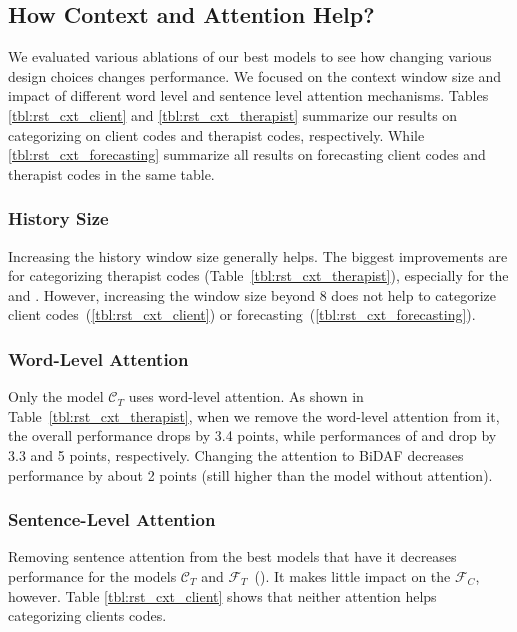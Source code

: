 \subsection{How Context and Attention Help?}
\label{ssec:snt:abl_context_attention}

We evaluated various ablations of our best models to see how changing
various design choices changes performance. We focused on the context
window size and impact of different word level and sentence level
attention mechanisms. Tables \ref{tbl:rst_cxt_client} and
\ref{tbl:rst_cxt_therapist} summarize our results on categorizing on
client codes and therapist codes, respectively. While
\autoref{tbl:rst_cxt_forecasting} summarize all results on forecasting
client codes and therapist codes in the same table.

\subsubsection{History Size}
\label{sssec:snt:history-size}
Increasing the history window size generally helps. The biggest
improvements are for categorizing therapist codes
(Table~\ref{tbl:rst_cxt_therapist}), especially for the \RES and
\REC. However, increasing the window size beyond 8 does not help
to categorize client codes~(\autoref{tbl:rst_cxt_client}) or
forecasting~(\autoref{tbl:rst_cxt_forecasting}).

\subsubsection{Word-Level Attention}
\label{sssec:snt:word-att-analysis}
Only the model $\mathcal{C}_{T}$ uses word-level attention. As shown
in Table~\ref{tbl:rst_cxt_therapist}, when we remove the word-level
attention from it, the overall performance drops by 3.4 points,
while performances of \RES and \REC drop by 3.3 and 5 points,
respectively. Changing the attention to BiDAF decreases performance
by about 2 points (still higher than the model without attention).

\subsubsection{Sentence-Level Attention}
\label{sssec:snt:snt-att-analysis}
Removing sentence attention from the best models that have it
decreases performance for the models $\mathcal{C}_T$ and
$\mathcal{F}_T$~().
%
%
  It makes little impact
on the $\mathcal{F}_C$, however.
%
Table \ref{tbl:rst_cxt_client} shows that neither attention helps
categorizing clients codes.
%

